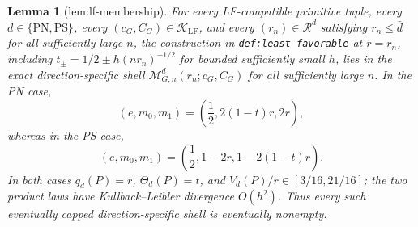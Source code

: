 \documentclass{article}
\newtheorem{lemma}{Lemma}
\begin{document}
\begin{lemma}[lem:lf-membership]\label{lem:lf-membership}
For every LF-compatible primitive tuple, every \(d\in\{\mathrm{PN},\mathrm{PS}\}\), every \((c_G,C_G)\in\mathcal K_{\mathrm{LF}}\), and every \((r_n)\in\mathcal R^d\) satisfying \(r_n\le\bar d\) for all sufficiently large \(n\), the construction in \texttt{def:least-favorable} at \(r=r_n\), including \(t_\pm=1/2\pm h(nr_n)^{-1/2}\) for bounded sufficiently small \(h\), lies in the exact direction-specific shell \(\mathcal M_{G,n}^d(r_n;c_G,C_G)\) for all sufficiently large \(n\). In the PN case,
\[(e,m_0,m_1)=\left(\frac12,2(1-t)r,2r\right),\]
whereas in the PS case,
\[(e,m_0,m_1)=\left(\frac12,1-2r,1-2(1-t)r\right).\]
In both cases \(q_d(P)=r\), \(\Theta_d(P)=t\), and \(V_d(P)/r\in[3/16,21/16]\); the two product laws have Kullback--Leibler divergence \(O(h^2)\). Thus every such eventually capped direction-specific shell is eventually nonempty.
\end{lemma}
\end{document}
